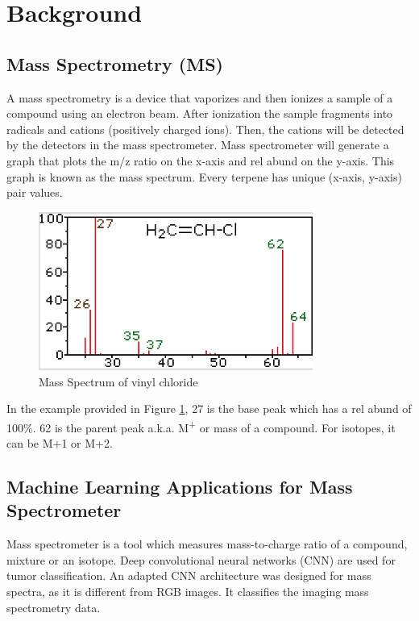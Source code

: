 \documentclass[12pt, a4paper]{article}
\begin{document}
\section{Background}

\subsection{Mass Spectrometry (MS)}
A mass spectrometry is a device that vaporizes and then ionizes a sample of a compound using an electron beam. After ionization the sample fragments into radicals and cations (positively charged ions). Then, the cations will be detected by the detectors in the mass spectrometer. Mass spectrometer will generate a graph that plots the %
m/z ratio on the x-axis and \gls{rel abund} on the y-axis. This graph is known as the mass spectrum. Every terpene has unique (x-axis, y-axis) pair values.

\begin{figure}[!ht]
\centering
    \begin{center}
        \includegraphics[width=9cm]{vyn.png}
    \end{center}
    \caption{Mass Spectrum of vinyl chloride}
    \label{fig:vyn}
\end{figure}


In the example provided in Figure \ref{fig:vyn}, 27 is the base peak which has a \gls{rel abund} of 100\%. 62 is the parent peak a.k.a. M\textsuperscript{+} or mass of a compound. For isotopes, it can be M+1 or M+2.

\subsection{Machine Learning Applications for Mass Spectrometer}
Mass spectrometer is a tool which measures mass-to-charge ratio of a compound, mixture or an isotope. Deep convolutional neural networks (CNN) are used for tumor classification. An adapted CNN architecture was designed for mass spectra, as it is different from RGB images. It classifies the imaging mass spectrometry data.
\end{document}
